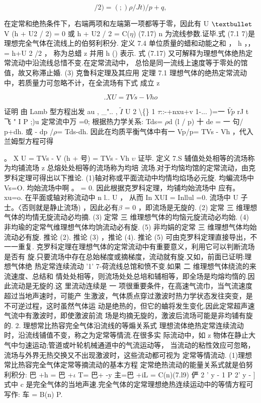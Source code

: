 \[/2) = (;) \rho  / J t) /p+q , \]

在定常和绝热条件下，右端两项和左端第一项都等于零，因此有 U ${\rm •}$ V (h + U2 / 2) = 0 或 h + U2 / 2 = C($\eta$) (7.17) n 为流线参数.证毕.式 (7.1 7)是理想完全气体在流线上的伯努利积分. 定义 7.4 单位质量的蜡和动能之和 ， h ，， = h+U 2 /2 ， 称为总蜡 z 并用 h () 表示. 式 (7.17) 又可解释为理想气体绝热定常流动中沿流线总惜不变.在定常流动中， 总恰是同一流线上速度等于零处的馆值，故又称滞止婚. (3) 克鲁科定理及其应用 定理 7.1 理想气体的绝热定常流动中，若质量力可忽略不计，在全流场有下式 成立 z

\begin{equation*}.  XU = TVs-Vh o\tag{7.18}\end{equation*}

证明 由 Lamb 型方程出发 au , \_".. , $\tilde{I}$ U 2 \textbackslash\{\} 1 $\tau$::-+nxu+v 1-... )=一 $\tilde{Vp}$ rJ t 飞 " I P ;)u 定常流中万 =0; 根据热力学关系: Tds= $\rho$d (l / p) 十 de = 一 句/ p+dh. 或 - dp /$\rho$= Tds-dh. 因此在均质平衡气体中有一 Vp/p= TVs - Vh ，代入兰姆型方程可得

。 X U = TVs - V (h + 号) = TVs - Vh $\upsilon$ 证毕. 定义 7.S 辅值处处相等的流场称为均铺流场 z 总熔处处相等的流场称为均培 流场.对于均恼均馆的定常流动，由克罗科定理可得出以下推论. (1)轴对称或平面流动中均情均焰场必元旋. 均蝙流场中 Vs=O. 均始流场中啊 。 = 0. 因此根据克罗科定理，均铺均始流场中 应有。 xu=o. 在平面或轴对称流动中 n l.. U ， 从而 In XUI = Inllul =0. 流场中 U 子士。〈否则就是静止流场) ，因此必有$\beta$ = 0 ，即流场是无旋的. (2) 定常 三 维理想气体的均情无旋流动必均摘. (3) 定常 三 维理想气体的均恼元旋流动必均始. (4) 非均瑜的定常气维理想气体均饷流动必有旋. (5) 非均娟的定常 三 维理想气体均始流动必有旋. 推论 (2). 推论 (3) ，推论 (4). 推论 (5) 可由克罗科定理直接导出，不一一重复. 克罗科定理在理想气体的定常流动中有重要意义，利用它可以判断流场是否有 旋.只要流场中存在总始梯度或摘梯度，流动就有旋.又如，前面已证明:理想气体绝 热定常连续流动 '1' 7-荷流线总馆和愤不变.如果 二 维理想气体绕流的来流速度、总结和 情处处相等，则流场处处总培和辅相等，即全场是均熔均惰的.因此流动是无旋的.这 里流动连续是 一 项很重要条件，在高速气流巾，当气流速度超过当地声速时，可能产 生激波，气体质点穿过激波时热力学状态发往突变，是不可逆过程，这时虽然气体运 动是绝热的，但它的蛐将发生变化.因此定常超声速气流中有激波时，即使激波前流 场是均摘无旋的，激波后流场可能是非均铺有旋的. 2. 理想常比热容完全气体沿流线的等煽关系式 理想流体绝热定常连续流动时，沿流线铺值不变，称之为定常等情流.在很多实 际流动中，如 z 物体在静止大气中匀速运动;管道或叶轮机械通道中的气流运动等， 当流动的粘性效应可忽略，流场与外界无热交换又不出现激波时，这些流动都可视为 定常等情流动. (1)理想常比热容完全气体定常等摘流动的基本方程 定常绝热流动的能量关系式就是伯努利积分: 巴 +h = 巴 +$\iota$ T= 巴+ -y 主=巴 +iL = C(n)(7.l9) 俨 2 ' y - 1 P 2' y - ] 式中 c 是完全气体的当地声速.完全气体的定常理想绝热连续运动中的等情方程可 写作: 车 = B(n) P.

